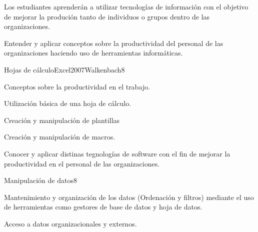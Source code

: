 \begin{syllabus}


\begin{justification}
Los estudiantes aprenderán a utilizar tecnologías de información con el objetivo de mejorar
la produción tanto de individuos o grupos dentro de las organizaciones.
\end{justification}

\begin{goals}
\item Entender y aplicar conceptos  sobre la productividad del personal de las organizaciones haciendo uso de herramientas informáticas.
\end{goals}

\begin{outcomes}
\end{outcomes}

\begin{unit}{Hojas de cálculo}{Excel2007Walkenbach}{8}
   \begin{topics}
      \item Conceptos sobre la productividad en el trabajo.
      \item Utilización básica de una hoja de cálculo.
      \item Creación y manipulación de plantillas
      \item Creación y manipulación de macros.
   \end{topics}

   \begin{unitgoals}
      \item Conocer y aplicar distinas  tegnologías  de software con el fin de mejorar la productividad en el personal de las organizaciones.
   \end{unitgoals}
\end{unit}

\begin{unit}{Manipulación de datos}{}{8}
   \begin{topics}
      \item Mantenimiento y organización de los datos (Ordenación y filtros) mediante el uso de herramientas como gestores de base de datos y hoja de datos.
      \item Acceso a datos organizacionales y externos.
   \end{topics}


\end{unit}
\end{syllabus}
